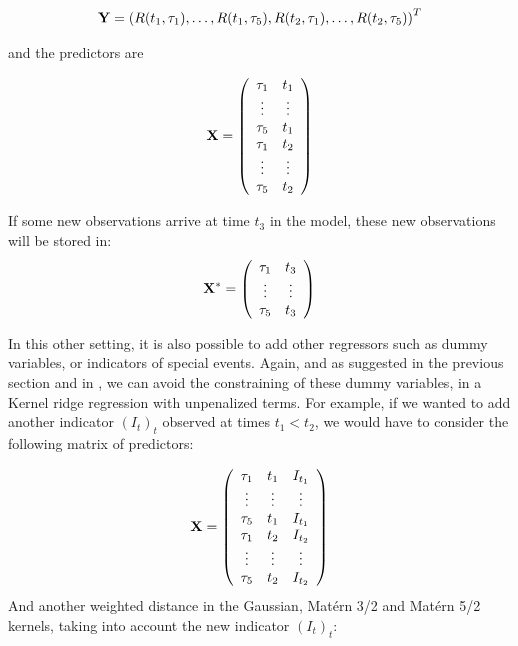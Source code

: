 $$
{\bf Y} = \left(R(t_1, \tau_1), \ldots, R(t_1, \tau_5), R(t_2, \tau_1), \ldots, R(t_2, \tau_5)\right)^T
$$

and the predictors are 

$$
{\bf X} = \left( {\begin{array}{cc} \tau_1 &  t_1\\
                          \vdots & \vdots\\
                          \tau_5 &  t_1\\
                          \tau_1 &  t_2\\
                          \vdots & \vdots\\
                          \tau_5 &  t_2\\
       \end{array} } \right)
$$

If some new observations arrive at time $t_3$ in the model, these new observations will be stored in: 
$$
{\bf X}^* = \left( {\begin{array}{cc} \tau_1 &  t_3\\
                          \vdots & \vdots\\
                          \tau_5 &  t_3\\
       \end{array} } \right)
$$

In this other setting, it is also possible to add other regressors  such as dummy variables, or indicators of special events. Again, and as suggested in the previous section and in \cite{exterkate2016nonlinear}, we can avoid the constraining of these dummy variables, in a Kernel ridge regression with unpenalized terms. For example, if we wanted to add another indicator $(I_t)_t$ observed at times $t_1 < t_2$, we would have to consider the following matrix of predictors:

$$
{\bf X} = \left( {\begin{array}{ccc}
                \tau_1 &  t_1   & I_{t_1}\\
                \vdots & \vdots & \vdots\\
                \tau_5 &  t_1   & I_{t_1}\\
                \tau_1 &  t_2   & I_{t_2}\\
                \vdots & \vdots & \vdots\\
                \tau_5 &  t_2   & I_{t_2}\\
               \end{array} } \right)
$$
And another weighted distance in the Gaussian, Mat\'ern 3/2 and Mat\'ern 5/2 kernels, taking into account the new indicator $(I_t)_t$:


